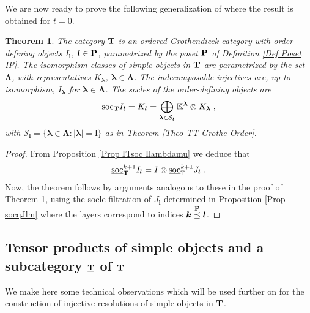 \documentclass[12pt]{article}
\def\KK {{\mathbb K}}     %
\def\TT {{\mathbb T}}     %
\def\mc {\mathcal}
\def\ul  {\underline}
\newtheorem{theorem}{Theorem}[section]
\begin{document}
We are now ready to prove the following generalization of \cite[Proposition 3.25]{Chirvasitu-Penkov-UTC} where the result is obtained for $t=0$.

\begin{theorem}\label{Theo ITT is Grothendieck Cat}
The category ${\bf T}$ is an ordered Grothendieck category with order-defining objects $I_{\bm l}$, $\bm l\in{\bf P}$, parametrized by the poset ${\bf P}$ of Definition \ref{Def Poset IP}. The isomorphism classes of simple objects in ${\bf T}$ are parametrized by the set $\bm\Lambda$, with representatives $K_{\bm\lambda}$, $\bm\lambda\in\bm\Lambda$. The indecomposable injectives are, up to isomorphism, $I_{\bm\lambda}$ for $\bm\lambda\in\bm\Lambda$. The socles of the order-defining objects are
\begin{gather*}
{\rm soc}_{{\bf T}}I_{\bm l} = K_{\bm l} = \bigoplus\limits_{\bm\lambda\in \mc S_{\bm l}} \KK^{\bm\lambda}\otimes K_{\bm\lambda} \;,
\end{gather*}
with $\mc S_{\bm l}=\{\bm\lambda\in\bm\Lambda:|\bm\lambda|=\bm l\}$ as in Theorem \ref{Theo TT Grothe Order}.
\end{theorem}

\begin{proof}
From Proposition \ref{Prop ITsoc Ilambdamu} we deduce that
\begin{gather}\label{For Relation socIT to socT}
\ul{\rm soc}_{{\bf T}}^{k+1}I_{\bm l} = I\otimes \ul{\rm soc}_{\TT}^{k+1}J_{\bm l} \;.
\end{gather}
Now, the theorem follows by arguments analogous to these in the proof of Theorem \ref{Theo ITT is Grothendieck Cat}, using the socle filtration of $J_{\bm l}$ determined in Proposition \ref{Prop socqJlm} where the layers correspond to indices $\bm k\stackrel{\bf P}{\preceq}\bm l$.
\end{proof}


\subsection{Tensor products of simple objects and a subcategory $\ul{\bf T}$ of ${\bf T}$}

We make here some technical observations which will be used further on for the construction of injective resolutions of simple objects in ${\bf T}$.
\end{document}
